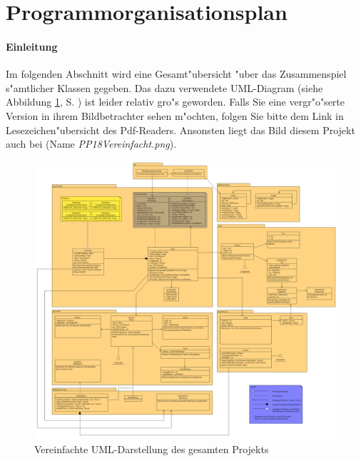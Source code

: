 \section{Programmorganisationsplan}
\paragraph{Einleitung}
Im folgenden Abschnitt wird eine Gesamt"ubersicht "uber das Zusammenspiel s"amtlicher Klassen gegeben. Das dazu verwendete UML-Diagram (siehe Abbildung \ref{fig:umlGesamtVereinfacht}, S.  \pageref{fig:umlGesamtVereinfacht}) ist leider relativ gro"s geworden. Falls Sie eine vergr"o"serte Version in ihrem Bildbetrachter sehen m"ochten, folgen Sie bitte dem Link in Lesezeichen"ubersicht des Pdf-Readers. Ansonsten liegt das Bild diesem Projekt auch bei (Name \emph{PP18Vereinfacht.png}). 


\begin{figure}[b]
	\centering
	\includegraphics[width=\linewidth]{pics/PP18Vereinfacht}
	\caption{Vereinfachte UML-Darstellung des gesamten Projekts}
	\label{fig:umlGesamtVereinfacht}
\end{figure}